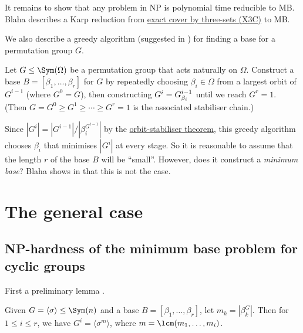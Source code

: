 It remains to show that any problem in NP is polynomial time reducible to MB. Blaha describes a Karp reduction from \hyperref[eg:X3C]{exact cover by three-sets (X3C)} to MB. 

We also describe a greedy algorithm (suggested in \cite{brown1989}) for finding a base for a permutation group $G$. 

\begin{algorithm}\label{alg:blaha_greedy_base}
    Let $G \leq \Sym(\Omega)$ be a permutation group that acts naturally on $\Omega$. Construct a base $B = [\beta_1,\dotsc,\beta_r]$ for $G$ by repeatedly choosing $\beta_i \in \Omega$ from a largest orbit of $G^{i-1}$ (where $G^0 = G$), then constructing $G^i = \added{2}{G^{i-1}_{\beta_i}}$ until we reach $G^r = 1$. (Then $G = G^0 \geq G^1 \geq \dotsb \geq G^r = 1$ is the associated stabiliser chain.)
\end{algorithm}

Since $|G^i| = |G^{i-1}|/|\beta_i^{G^{i-1}}|$ by the \hyperref[thm:orbit_stabiliser]{orbit-stabiliser theorem}, this greedy algorithm chooses $\beta_i$ that minimises $|G^i|$ at every stage. So it is reasonable to assume that the length $r$ of the base $B$ will be ``small''. However, does it construct a \textit{minimum base}? Blaha shows in \cite{blaha1992} that this is not the case.

\section{The general case}

\subsection{NP-hardness of the minimum base problem for cyclic groups}

First a preliminary lemma .

\begin{lemma}\label{lem:blaha_cyclic_stabiliser}
    Given $G = \langle \sigma \rangle \leq \Sym(n)$ and a base $B = [\beta_1,\dotsc,\beta_r]$, let $m_k = |\beta_k^G|$. Then for $1 \leq i \leq r$, we have $G^i = \langle \sigma^m \rangle$, where $m = \lcm(m_1,\dotsc,m_i)$.
\end{lemma}

